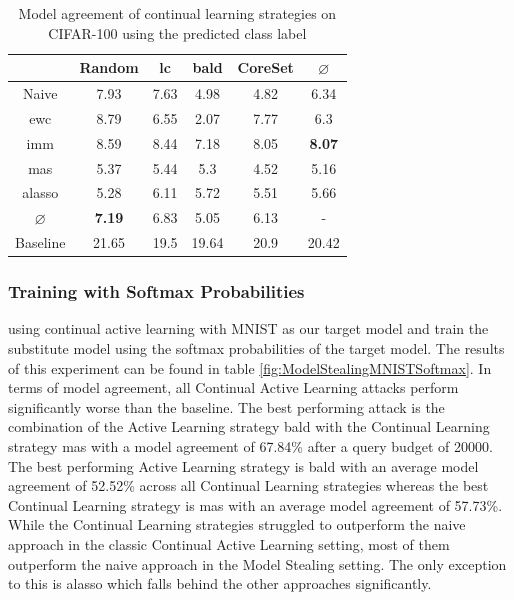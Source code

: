 \begin{table}[h]
    \centering
    \begin{tabular}{ c | c c c c | c } 
         & Random & \gls{lc} & \gls{bald} & CoreSet & $\varnothing$\\ 
        \hline
        Naive & 7.93 & 7.63 & 4.98 & 4.82 & 6.34\\
        \gls{ewc} & 8.79 & 6.55 & 2.07 & 7.77 & 6.3\\
        \gls{imm} & 8.59 & 8.44 & 7.18 & 8.05 & \textbf{8.07}\\
        \gls{mas} & 5.37 & 5.44 & 5.3 & 4.52 & 5.16\\
        \gls{alasso} & 5.28 & 6.11 & 5.72 & 5.51 & 5.66\\
        \hline
        $\varnothing$ & \textbf{7.19} & 6.83 & 5.05 & 6.13 & -\\
        Baseline & 21.65 & 19.5 & 19.64 & 20.9 & 20.42\\
    \end{tabular}
    \caption{Model agreement of continual learning strategies on CIFAR-100 using the predicted class label}
    \label{fig:ModelStealingCIFAR100Label}
\end{table}




\subsubsection{Training with Softmax Probabilities}
\label{sec:Evaluation:MS:Regularization:Softmax}


using continual active learning with MNIST as our target model and train the substitute model using the
softmax probabilities of the target model. The results of this experiment can be found in table \ref{fig:ModelStealingMNISTSoftmax}. In terms of model agreement, all Continual
Active Learning attacks perform significantly worse than the baseline. The best performing attack is the combination of the Active Learning strategy \gls{bald} with the
Continual Learning strategy \gls{mas} with a model agreement of 67.84\% after a query budget of 20000. The best performing Active Learning strategy is \gls{bald} with
an average model agreement of 52.52\% across all Continual Learning strategies whereas the best Continual Learning strategy is \gls{mas} with an average model agreement
of 57.73\%. While the Continual Learning strategies struggled to outperform the naive approach in the classic Continual Active Learning setting, most of them outperform
the naive approach in the Model Stealing setting. The only exception to this is \gls{alasso} which falls behind the other approaches significantly. \par 

